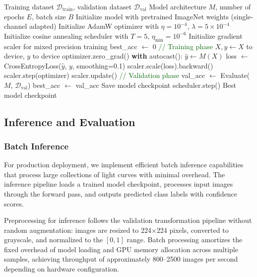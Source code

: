 \documentclass[11pt,a4paper]{article}
\begin{document}
\begin{algorithm}[htbp]
\caption{Model Training Procedure}
\label{alg:training}
\begin{algorithmic}[1]
\Require Training dataset $\mathcal{D}_{\text{train}}$, validation dataset $\mathcal{D}_{\text{val}}$
\Require Model architecture $M$, number of epochs $E$, batch size $B$
\State Initialize model with pretrained ImageNet weights (single-channel adapted)
\State Initialize AdamW optimizer with $\eta = 10^{-4}$, $\lambda = 5 \times 10^{-4}$
\State Initialize cosine annealing scheduler with $T = 5$, $\eta_{\text{min}} = 10^{-6}$
\State Initialize gradient scaler for mixed precision training
\State best\_acc $\leftarrow$ 0
    \State \textcolor{darkgreen}{// Training phase}
        \State $X, y \leftarrow X$ to device, $y$ to device
        \State optimizer.zero\_grad()
        \State \textbf{with} autocast():
            \State \quad $\hat{y} \leftarrow M(X)$
            \State \quad loss $\leftarrow$ CrossEntropyLoss($\hat{y}$, $y$, smoothing=0.1)
        \State scaler.scale(loss).backward()
        \State scaler.step(optimizer)
        \State scaler.update()
    \EndFor
    \State \textcolor{darkgreen}{// Validation phase}
    \State val\_acc $\leftarrow$ Evaluate($M$, $\mathcal{D}_{\text{val}}$)
        \State best\_acc $\leftarrow$ val\_acc
        \State Save model checkpoint
    \EndIf
    \State scheduler.step()
\EndFor
\State \Return Best model checkpoint
\end{algorithmic}
\end{algorithm}

\subsection{Inference and Evaluation}

\subsubsection{Batch Inference}

For production deployment, we implement efficient batch inference capabilities that process large collections of light curves with minimal overhead. The inference pipeline loads a trained model checkpoint, processes input images through the forward pass, and outputs predicted class labels with confidence scores.

Preprocessing for inference follows the validation transformation pipeline without random augmentation: images are resized to 224$\times$224 pixels, converted to grayscale, and normalized to the $[0, 1]$ range. Batch processing amortizes the fixed overhead of model loading and GPU memory allocation across multiple samples, achieving throughput of approximately 800--2500 images per second depending on hardware configuration.
\end{document}
